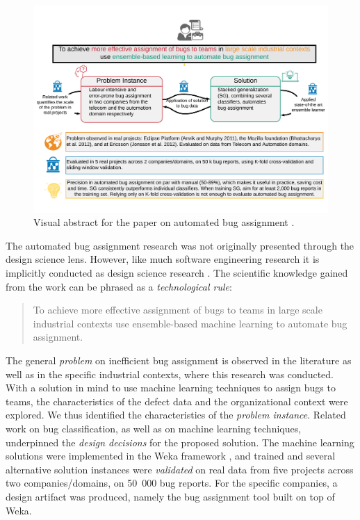 \documentclass[graybox]{svmult}
\begin{document}
\begin{figure}[t]
\begin{center}
\includegraphics[width=\columnwidth, trim={5mm 20mm 5mm 20mm },clip]{Figures/VATemplateJonsson.pdf}
\caption{Visual abstract for the paper on automated bug assignment \cite{JonssonBug15}.}
\label{fig:BugAssignment}
\end{center}
\end{figure}

The automated bug assignment research was not originally presented through the design science lens. However, like much software engineering research it is implicitly conducted as design science research \cite{Engstrom19arxiv}. 
The scientific knowledge gained from the work can be phrased as a \emph{technological rule}:
\begin{quote}{To achieve more effective assignment of bugs to teams in large scale industrial contexts use ensemble-based machine learning to automate bug assignment. \cite{StoreyESEM17}}\end{quote}

The general \emph{problem} on inefficient bug assignment is observed in the literature as well as in the specific industrial contexts, where this research was conducted. With a solution in mind to use machine learning techniques to assign bugs to teams, the characteristics of the defect data and the organizational context were explored. We thus identified the characteristics of the \emph{problem instance}. Related work on bug classification, as well as on machine learning techniques, underpinned the \emph{design decisions} for the proposed solution. The machine learning solutions were implemented in the Weka framework \cite{hall_weka_2009}, and trained and several alternative solution instances were \emph{validated} on real data from five projects across two companies/domains, on 50~000 bug reports. For the specific companies, a design artifact was produced, namely the bug assignment tool built on top of Weka.
\end{document}
